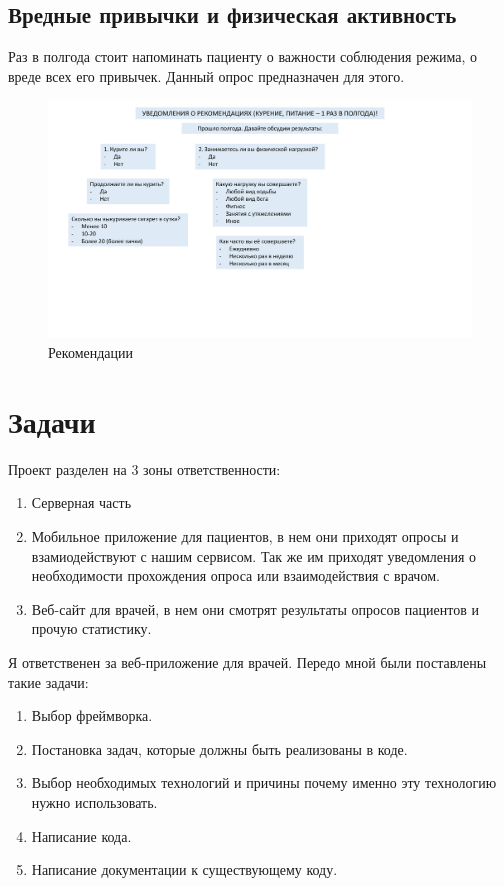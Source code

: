 \documentclass[a4paper,12pt]{article}
\begin{document}
	\newpage

	\subsection{Вредные привычки и физическая активность}

	Раз в полгода стоит напоминать пациенту о важности соблюдения режима, о вреде всех его привычек.
	Данный опрос предназначен для этого.

	\begin{figure}[h]
		\includegraphics[scale=0.175]{images/presentation/1cbc101521d4d97c799189ce193d279d-2}
		\caption{Рекомендации}\label{fig:figure3}
	\end{figure}


	\newpage
	\section{Задачи}
		Проект разделен на 3 зоны ответственности:
		\begin{enumerate}
			\item Серверная часть
			\item Мобильное приложение для пациентов, в нем они приходят опросы и взамиодействуют с нашим сервисом. Так же им приходят уведомления о необходимости прохождения опроса или взаимодействия с врачом.
			\item Веб-сайт для врачей, в нем они смотрят результаты опросов пациентов и прочую статистику.
		\end{enumerate}
		Я ответственен за веб-приложение для врачей.
		Передо мной были поставлены такие задачи:


		\begin{enumerate}
			\item Выбор фреймворка.
			\item Постановка задач, которые должны быть реализованы в коде.
			\item Выбор необходимых технологий и причины почему именно эту технологию нужно использовать.
			\item Написание кода.
			\item Написание документации к существующему коду.

		\end{enumerate}
\end{document}
